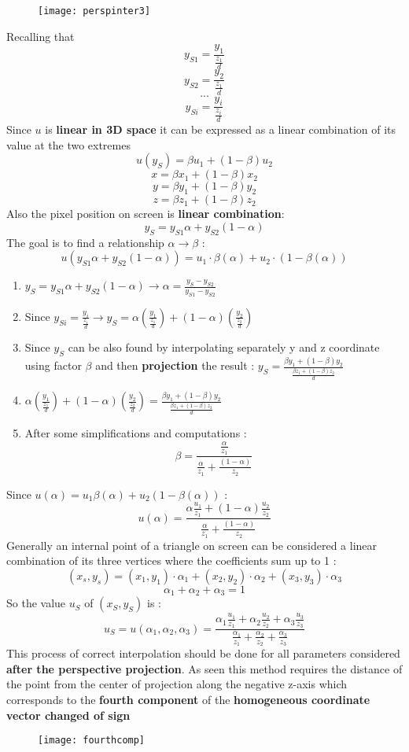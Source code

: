 \begin{figure}[H]
  \centering
  \texttt{[image: perspinter3]}
\end{figure}
Recalling that $$y_{S1} = \frac{y_1}{\frac{z_1}{d}}$$ $$y_{S2} = \frac{y_2}{\frac{z_1}{d}}$$ $$ ... $$ $$y_{Si} = \frac{y_i}{\frac{z_i}{d}}$$
Since $u$ is \textbf{linear in 3D space} it can be expressed as a linear combination of its value at the two extremes $$ u(y_S) = \beta u_1 + (1-\beta)u_2$$
$$ x= \beta x_1 + (1-\beta)x_2$$
$$ y = \beta y_1 + (1-\beta)y_2$$
$$ z = \beta z_1 + (1-\beta)z_2$$
Also the pixel position on screen is \textbf{linear combination}:
$$ y_S = y_{S1}\alpha + y_{S2} (1-\alpha)$$
The goal is to find a relationship $ \alpha \rightarrow \beta$ :  
$$ u(y_{S1}\alpha + y_{S2}(1-\alpha))= u_1 \cdot \beta(\alpha)+ u_2 \cdot (1-\beta(\alpha)) $$
\begin{enumerate}
\item $ y_S = y_{S1}\alpha + y_{S2} (1-\alpha) \rightarrow \alpha = \frac{y_S - y_{S2}}{y_{S1} - y_{S2} }$
\item Since $y_{Si} = \frac{y_i}{\frac{z_i}{d}} \rightarrow y_S = \alpha \left(\frac{y_1}{\frac{z_1}{d}} \right) + (1-\alpha) \left(\frac{y_2}{\frac{z_2}{d}}\right)$
\item Since $y_S$ can be also found by interpolating separately y and z coordinate using factor $\beta$ and then \textbf{projection} the result : $y_S = \frac{\beta y_1 + (1-\beta) y_2}{\frac{\beta z_1 + (1-\beta)z_2}{d}}$
\item  $\alpha \left(\frac{y_1}{\frac{z_1}{d}} \right) + (1-\alpha) \left(\frac{y_2}{\frac{z_2}{d}}\right) =\frac{\beta y_1 + (1-\beta) y_2}{\frac{\beta z_1 + (1-\beta)z_2}{d}} $
\item After some simplifications and computations : \[ \boxed{\beta = \frac{\frac{\alpha}{z_1}}{\frac{\alpha}{z_1}+ \frac{(1-\alpha)}{z_2}}} \]
\end{enumerate}
Since $u(\alpha) = u_1\beta(\alpha)+ u_2(1-\beta(\alpha))$ : 
\[
\boxed{u(\alpha)= \frac{\alpha \frac{u_1}{z_1}+(1-\alpha) \frac{u_2}{z_2}}{\frac{\alpha}{z_1}+\frac{(1-\alpha)}{z_2}}}
\]
Generally an internal point of a triangle on screen can be considered a linear combination of its three vertices where the coefficients sum up to 1 : 
$$ (x_s,y_s) = (x_1,y_1) \cdot \alpha_1 + (x_2,y_2)\cdot \alpha_2 + (x_3,y_3)\cdot \alpha_3$$ $$ \alpha_1 + \alpha_2 + \alpha_3 = 1$$ So the value $u_S$ of $(x_S,y_S)$ is :
\[
\boxed{u_S=u(\alpha_1,\alpha_2,\alpha_3)= \frac{\alpha_1 \frac{u_1}{z_1}+\alpha_2 \frac{u_2}{z_2} + \alpha_3 \frac{u_3}{z_3}}{\frac{\alpha_1}{z_1}+\frac{\alpha_2}{z_2} + \frac{\alpha_3}{z_3}}}
\]
This process of correct interpolation should be done for all parameters considered \textbf{after the perspective projection}. As seen this method requires the distance of the point from the center of projection along the negative z-axis which corresponds to the \textbf{fourth component} of the \textbf{homogeneous coordinate vector changed of sign}
\begin{figure}[H]
  \centering
  \texttt{[image: fourthcomp]} 
\end{figure}